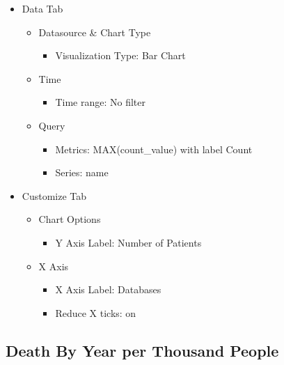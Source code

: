 \documentclass[
]{book}
\providecommand{\tightlist}{%
  \setlength{\itemsep}{0pt}\setlength{\parskip}{0pt}}
\begin{document}
\begin{itemize}
\tightlist
\item
  Data Tab

  \begin{itemize}
  \tightlist
  \item
    Datasource \& Chart Type

    \begin{itemize}
    \tightlist
    \item
      Visualization Type: Bar Chart
    \end{itemize}
  \item
    Time

    \begin{itemize}
    \tightlist
    \item
      Time range: No filter
    \end{itemize}
  \item
    Query

    \begin{itemize}
    \tightlist
    \item
      Metrics: MAX(count\_value) with label Count
    \item
      Series: name
    \end{itemize}
  \end{itemize}
\item
  Customize Tab

  \begin{itemize}
  \tightlist
  \item
    Chart Options

    \begin{itemize}
    \tightlist
    \item
      Y Axis Label: Number of Patients
    \end{itemize}
  \item
    X Axis

    \begin{itemize}
    \tightlist
    \item
      X Axis Label: Databases
    \item
      Reduce X ticks: on
    \end{itemize}
  \end{itemize}
\end{itemize}

\hypertarget{death-by-year-per-thousand-people}{%
\subsection*{Death By Year per Thousand People}\label{death-by-year-per-thousand-people}}
\end{document}
